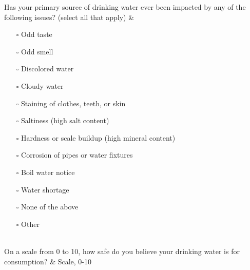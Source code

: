 \documentclass[
]{article}
\begin{document}
\begin{longtblr}[         %
caption={},
entry=none,label=none,
note{1}={Matrix style question.},
label=tblr:quest,
caption={Survey questions.},
]
Has your primary source of drinking water ever been impacted by any of the following issues? (select all that apply)                                                                                                                                                                                                                                                                                                                                                         & \begin{itemize}[nosep]    \item[$\square$] Odd taste    \item[$\square$] Odd smell    \item[$\square$] Discolored water    \item[$\square$] Cloudy water    \item[$\square$] Staining of clothes, teeth, or skin    \item[$\square$] Saltiness (high salt content)    \item[$\square$] Hardness or scale buildup (high mineral content)    \item[$\square$] Corrosion of pipes or water fixtures    \item[$\square$] Boil water notice    \item[$\square$] Water shortage    \item[$\square$] None of the above    \item[$\square$] Other    \end{itemize} \\
On a scale from 0 to 10, how safe do you believe your drinking water is for consumption?                                                                                                                                                                                                                                                                                                                                                                                     & Scale, 0-10                                                                                                                                                                                                                                                                                                                                                                                                                                                                                                                                                                                                    \\

\end{longtblr}
\end{document}
